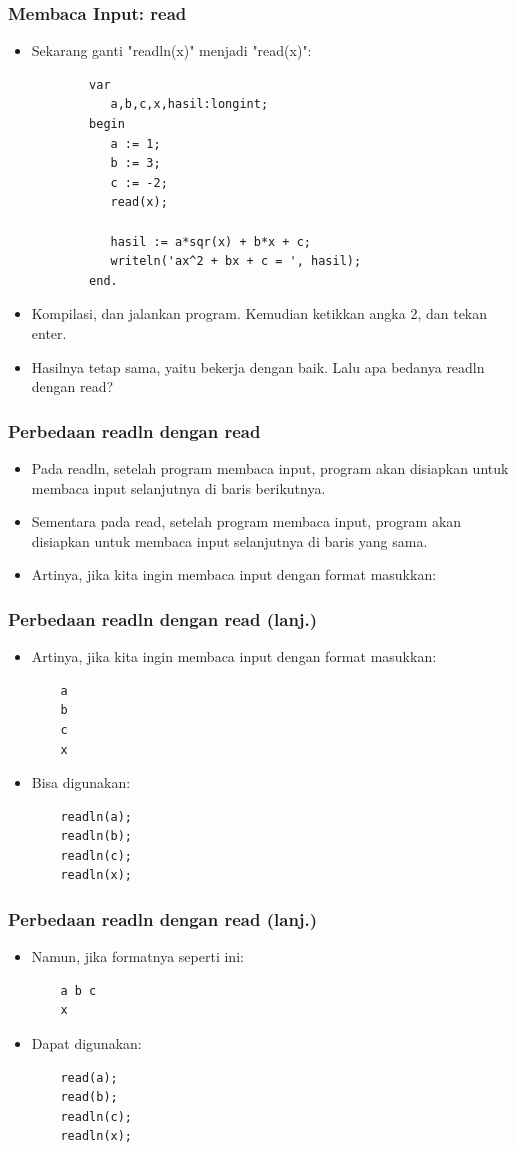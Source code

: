 \documentclass{beamer}
\begin{document}
\begin{frame}[fragile]
\frametitle{Membaca Input: read}
\begin{itemize}
	\item Sekarang ganti "readln(x)" menjadi "read(x)":
	\begin{lstlisting}
		var
		   a,b,c,x,hasil:longint;
		begin
		   a := 1;
		   b := 3;
		   c := -2;
		   read(x);
		
		   hasil := a*sqr(x) + b*x + c;
		   writeln('ax^2 + bx + c = ', hasil);
		end.
	\end{lstlisting}
	\item Kompilasi, dan jalankan program. Kemudian ketikkan angka 2, dan tekan enter.
	\item Hasilnya tetap sama, yaitu bekerja dengan baik. Lalu apa bedanya readln dengan read?
\end{itemize}
\end{frame}

\begin{frame}[fragile]
\frametitle{Perbedaan readln dengan read}
\begin{itemize}
	\item Pada readln, setelah program membaca input, program akan disiapkan untuk membaca input selanjutnya di \alert{baris berikutnya}.
	\item Sementara pada read, setelah program membaca input, program akan disiapkan untuk membaca input selanjutnya di \alert{baris yang sama}.
	\item Artinya, jika kita ingin membaca input dengan format masukkan:
\end{itemize}
\end{frame}

\begin{frame}[fragile]
\frametitle{Perbedaan readln dengan read (lanj.)}
\begin{itemize}
	\item Artinya, jika kita ingin membaca input dengan format masukkan:
	\begin{lstlisting}
	a
	b
	c
	x
	\end{lstlisting}
	\item Bisa digunakan:
	\begin{lstlisting}
	readln(a);
	readln(b);
	readln(c);
	readln(x);
	\end{lstlisting}
\end{itemize}
\end{frame}

\begin{frame}[fragile]
\frametitle{Perbedaan readln dengan read (lanj.)}
\begin{itemize}
	\item Namun, jika formatnya seperti ini:
	\begin{lstlisting}
	a b c
	x
	\end{lstlisting}
	\item Dapat digunakan:
	\begin{lstlisting}
	read(a);
	read(b);
	readln(c);
	readln(x);
	\end{lstlisting}
\end{itemize}
\end{frame}
\end{document}

